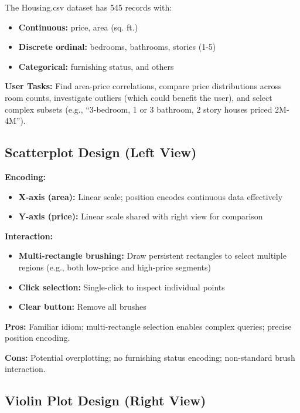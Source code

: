\documentclass[sigplan,screen]{acmart}
\begin{document}
The Housing.csv dataset has 545 records with:

\begin{itemize}
\item \textbf{Continuous:} price, area (sq. ft.)
\item \textbf{Discrete ordinal:} bedrooms, bathrooms, stories (1-5)
\item \textbf{Categorical:} furnishing status, and others
\end{itemize}

\textbf{User Tasks:} Find area-price correlations, compare price
distributions across room counts, investigate outliers (which could benefit the user), and select
complex subsets (e.g., ``3-bedroom, 1 or 3 bathroom, 2 story houses priced 2M-4M'').

\subsection{Scatterplot Design (Left View)}

\textbf{Encoding:}
\begin{itemize}
\item \textbf{X-axis (area):} Linear scale; position encodes continuous
      data effectively
\item \textbf{Y-axis (price):} Linear scale shared with right view for
      comparison
\end{itemize}

\textbf{Interaction:}
\begin{itemize}
\item \textbf{Multi-rectangle brushing:} Draw persistent rectangles to
      select multiple regions (e.g., both low-price and high-price
      segments)
\item \textbf{Click selection:} Single-click to inspect individual
      points
\item \textbf{Clear button:} Remove all brushes
\end{itemize}

\textbf{Pros:} Familiar idiom; multi-rectangle selection enables complex
queries; precise position encoding.

\textbf{Cons:} Potential overplotting; no furnishing status encoding;
non-standard brush interaction.

\subsection{Violin Plot Design (Right View)}
\end{document}

